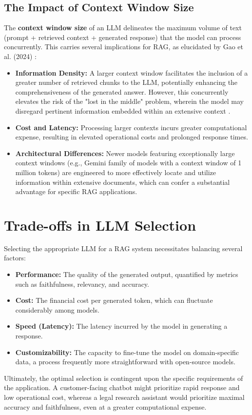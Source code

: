 \subsection{The Impact of Context Window Size}
The \textbf{context window size} of an LLM delineates the maximum volume of text (prompt + retrieved context + generated response) that the model can process concurrently. This carries several implications for RAG, as elucidated by Gao et al. (2024) \autocite{gao2024retrievalaugmented}:
\begin{itemize}
    \item \textbf{Information Density:} A larger context window facilitates the inclusion of a greater number of retrieved chunks to the LLM, potentially enhancing the comprehensiveness of the generated answer. However, this concurrently elevates the risk of the "lost in the middle" problem, wherein the model may disregard pertinent information embedded within an extensive context \autocite{liu2023lost}.
    \item \textbf{Cost and Latency:} Processing larger contexts incurs greater computational expense, resulting in elevated operational costs and prolonged response times.
    \item \textbf{Architectural Differences:} Newer models featuring exceptionally large context windows (e.g., Gemini family of models with a context window of 1 million tokens) are engineered to more effectively locate and utilize information within extensive documents, which can confer a substantial advantage for specific RAG applications.
\end{itemize}

\section{Trade-offs in LLM Selection}
Selecting the appropriate LLM for a RAG system necessitates balancing several factors:
\begin{itemize}
    \item \textbf{Performance:} The quality of the generated output, quantified by metrics such as faithfulness, relevancy, and accuracy.
    \item \textbf{Cost:} The financial cost per generated token, which can fluctuate considerably among models.
    \item \textbf{Speed (Latency):} The latency incurred by the model in generating a response.
    \item \textbf{Customizability:} The capacity to fine-tune the model on domain-specific data, a process frequently more straightforward with open-source models.
\end{itemize}

Ultimately, the optimal selection is contingent upon the specific requirements of the application. A customer-facing chatbot might prioritize rapid response and low operational cost, whereas a legal research assistant would prioritize maximal accuracy and faithfulness, even at a greater computational expense.
